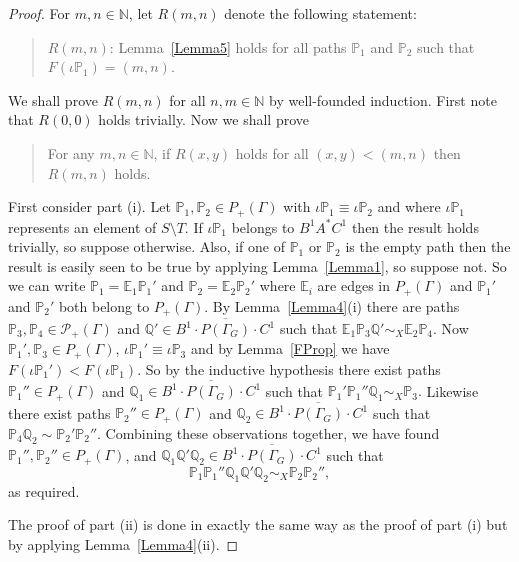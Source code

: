 \documentclass[11pt]{amsart}
\theoremstyle{plain}
\begin{document}
\begin{proof}
For $m,n \in \mathbb{N}$, let $R(m,n)$ denote the following statement:
\begin{quote}
$R(m,n)$: Lemma~\ref{Lemma5} holds for all paths ${\mathbb{P}}_1$ and ${\mathbb{P}}_2$ such that $F(\iota {\mathbb{P}}_1) = (m,n)$. 
\end{quote}
We shall prove $R(m,n)$ for all $n,m \in \mathbb{N}$ by well-founded induction. First note that $R(0,0)$ holds trivially. Now we shall prove 
\begin{quote}
For any $m,n \in \mathbb{N}$, if $R(x,y)$ holds for all $(x,y) < (m,n)$ then $R(m,n)$ holds. 
\end{quote} 
First consider part (i). Let ${\mathbb{P}}_1, {\mathbb{P}}_2 \in P_+(\Gamma)$ with $\iota {\mathbb{P}}_1 \equiv \iota {\mathbb{P}}_2$ and where $\iota {\mathbb{P}}_1$ represents an element of $S \setminus T$. If $\iota {\mathbb{P}}_1$ belongs to $B^1 A^* C^1$ then the result holds trivially, so suppose otherwise. Also, if one of ${\mathbb{P}}_1$ or ${\mathbb{P}}_2$ is the empty path then the result is easily seen to be true by applying Lemma~\ref{Lemma1}, so suppose not. So we can write ${\mathbb{P}}_1 = {\mathbb{E}}_1 {\mathbb{P}}_1'$ and ${\mathbb{P}}_2 = {\mathbb{E}}_2 {\mathbb{P}}_2'$ where ${\mathbb{E}}_i$ are edges in $P_+(\Gamma)$ and ${\mathbb{P}}_1'$ and  ${\mathbb{P}}_2'$ both belong to $P_+(\Gamma)$. By Lemma~\ref{Lemma4}(i) there are  paths ${\mathbb{P}}_3, {\mathbb{P}}_4 \in \mathcal{P}_+(\Gamma)$ and ${\mathbb{Q}}' \in \overline{B^1 \cdot P(\Gamma_G) \cdot C^1}$ such that 
$
{\mathbb{E}}_1 {\mathbb{P}}_3 {\mathbb{Q}}' \sim_X {\mathbb{E}}_2 {\mathbb{P}}_4.
$
Now ${\mathbb{P}}_1', {\mathbb{P}}_3 \in P_+(\Gamma)$, $\iota {\mathbb{P}}_1' \equiv \iota {\mathbb{P}}_3$ and by Lemma~\ref{FProp} we have $F(\iota {\mathbb{P}}_1') < F(\iota {\mathbb{P}}_1)$. So by the inductive hypothesis there exist paths ${\mathbb{P}}_1'' \in P_+(\Gamma)$ and ${\mathbb{Q}}_1 \in \overline{B^1 \cdot P(\Gamma_G) \cdot C^1}$ such that
$
{\mathbb{P}}_1' {\mathbb{P}}_1'' {\mathbb{Q}}_1 \sim_X {\mathbb{P}}_3.
$
Likewise there exist paths ${\mathbb{P}}_2'' \in P_+(\Gamma)$ and ${\mathbb{Q}}_2 \in \overline{B^1 \cdot P(\Gamma_G) \cdot C^1}$ such that
$
{\mathbb{P}}_4 {\mathbb{Q}}_2 \sim {\mathbb{P}}_2' {\mathbb{P}}_2''.
$
Combining these observations together, we have found ${\mathbb{P}}_1'', {\mathbb{P}}_2'' \in P_+(\Gamma)$, and ${\mathbb{Q}}_1 {\mathbb{Q}}' {\mathbb{Q}}_2 \in \overline{B^1 \cdot P(\Gamma_G) \cdot C^1}$ such that
\[
{\mathbb{P}}_1 {\mathbb{P}}_1'' {\mathbb{Q}}_1 {\mathbb{Q}}' {\mathbb{Q}}_2 \sim_X {\mathbb{P}}_2 {\mathbb{P}}_2'',
\]
as required.

The proof of part (ii) is done in exactly the same way as the proof of part (i) but by applying Lemma~\ref{Lemma4}(ii).
\end{proof}
\end{document}
